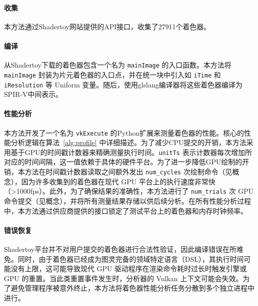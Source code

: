\paragraph{收集}
本方法通过Shadertoy网站提供的API接口，收集了27911个着色器。

\paragraph{编译}
从Shadertoy下载的着色器包含一个名为 \verb|mainImage| 的入口函数。本方法将 \verb|mainImage| 封装为片元着色器的入口点，并在统一块中引入如 \verb|iTime| 和 \verb|iResolution| 等 Uniform 变量。随后，使用glslang编译器将这些着色器编译为SPIR-V中间表示。

\paragraph{性能分析}
本方法开发了一个名为 \verb|vkExecute| 的Python扩展来测量着色器的性能。核心的性能分析逻辑在算法~\ref{alg:profile} 中详细描述。为了减少CPU提交的开销，本方法采用基于GPU的时间戳计数器来精确测量执行时间。\verb|unitTs| 表示计数器每次增加所对应的时间间隔，这一值依赖于具体的硬件平台。为了进一步降低GPU绘制的开销，本方法在时间戳计数器读取之间额外发出 \verb|num_cycles| 次绘制命令（见概念\label{concept:numCycles}），因为许多收集到的着色器在现代 GPU 平台上的执行速度非常快（>1000fps）。此外，为了确保结果的准确性，本方法进行了 \verb|num_trials| 次 GPU 命令提交（见概念\label{concept:numTrials}），并将所有测量结果存储以供后续分析。在所有性能分析过程中，本方法通过供应商提供的接口锁定了测试平台上的着色器和内存时钟频率。

\paragraph{错误恢复}
Shadertoy平台并不对用户提交的着色器进行合法性验证，因此编译错误在所难免。同时，由于着色器已经成为图灵完备的领域特定语言（DSL），其执行时间可能没有上限，这可能导致现代 GPU 驱动程序在渲染命令耗时过长时触发引擎或 GPU 的重置。当此类重置事件发生时，分析器的 Vulkan 上下文可能会失效。为了避免管理程序被意外终止，本方法将着色器性能分析任务分散到多个独立进程中进行。


